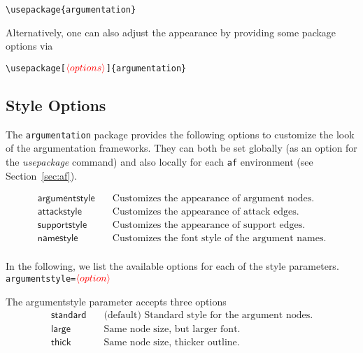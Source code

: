 \documentclass{article}
\newcommand{\argumentation}{\texttt{argumentation}\xspace}
\newcommand{\opt}[2][red]{\ensuremath{\textcolor{#1}{\langle #2\rangle}}}
\begin{document}
    \verb|\usepackage{argumentation}|

    \noindent
    Alternatively, one can also adjust the appearance by providing some package options via

    \verb|\usepackage[|\opt{options}\verb|]{argumentation}|

\subsection{Style Options}\label{sec:style}
    \begin{list}{}{\leftmargin=\parindent\rightmargin=0pt}
        \item The \argumentation package provides the following options to customize the look of the argumentation frameworks. They can both be set globally (as an option for the \emph{usepackage} command) and also locally for each \texttt{af} environment (see Section~\ref{sec:af}).
    \end{list}
    \vspace{-0.3cm}
    \begin{align*}
        \mathsf{argumentstyle} &\quad \text{Customizes the appearance of argument nodes.}\\
        \mathsf{attackstyle} &\quad \text{Customizes the appearance of attack edges.}\\
        \mathsf{supportstyle} &\quad \text{Customizes the appearance of support edges.}\\
        \mathsf{namestyle} &\quad \text{Customizes the font style of the argument names.}\\
    \end{align*}

    In the following, we list the available options for each of the style parameters.\\

\noindent\texttt{argumentstyle=}\opt{option}

    The \textsf{argumentstyle} parameter accepts three options
    \begin{align*}
        \mathsf{standard} &\quad \text{(default) Standard style for the argument nodes.}\\
        \mathsf{large} &\quad \text{Same node size, but larger font.}\\
        \mathsf{thick} &\quad \text{Same node size, thicker outline.}\\
    \end{align*}
\end{document}
